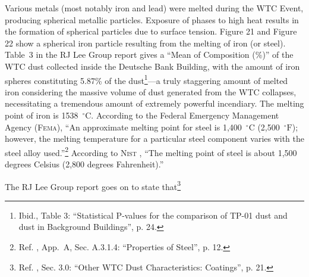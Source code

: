 \documentclass[letterpaper,12pt]{article}
\newenvironment{squote}
  {\small\quote}
  {\endquote\normalsize}
\begin{document}
\begin{squote}
Various metals (most notably iron and lead) were melted during the WTC Event, producing spherical metallic particles. Exposure of phases to high heat results in the formation of spherical particles due to surface tension. Figure 21 and Figure 22 show a spherical iron particle resulting from the melting of iron (or steel).
\end{squote} Table~3 in the RJ Lee Group report gives a ``Mean of Composition (\%)'' of the WTC dust collected inside the Deutsche Bank Building, with the amount of iron spheres constituting 5.87\% of the dust\footnote{Ibid., Table 3: ``Statistical P-values for the comparison of TP-01 dust and dust in Background Buildings'', p. 24.}---a truly staggering amount of melted iron considering the massive volume of dust generated from the WTC collapses, necessitating a tremendous amount of extremely powerful incendiary. The melting point of iron is 1538~\( ^{\circ}\text{C} \). According to the Federal Emergency Management Agency (\textsc{Fema}), ``An approximate melting point for steel is 1,400~\( ^{\circ}\text{C} \) (2,500~\( ^{\circ}\text{F} \)); however, the melting temperature for a particular steel component varies with the steel alloy used.''\footnote{Ref. , App.~A, Sec. A.3.1.4: ``Properties of Steel'', p. 12.} According to \textsc{Nist} \cite{NISTFAQ2006}, ``The melting point of steel is about 1,500 degrees Celsius (2,800 degrees Fahrenheit).''

The RJ Lee Group report goes on to state that\footnote{Ref. , Sec. 3.0: ``Other WTC Dust Characteristics: Coatings'', p. 21.}
\end{document}
